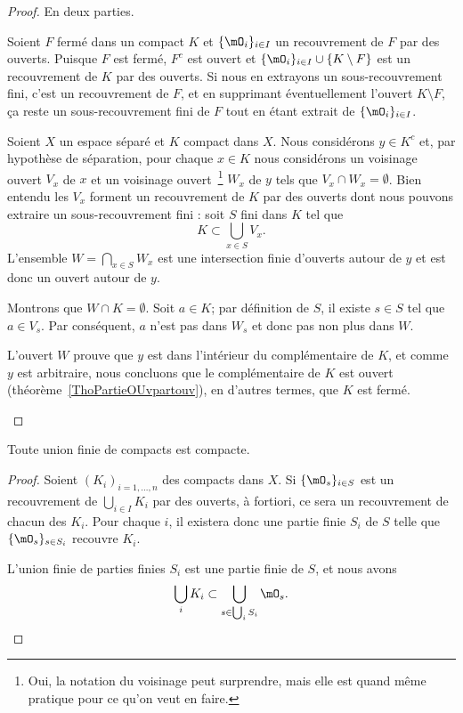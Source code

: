 \begin{proof}
	En deux parties.
	\begin{subproof}
		Soient \( F\) fermé dans un compact \( K\) et \( \{ \mO_i \}_{i\in I}\) un recouvrement de \( F\) par des ouverts. Puisque \( F\) est fermé, \( F^c\) est ouvert et \( \{ \mO_i \}_{i\in I}\cup\{ K\setminus F \}\) est un recouvrement de \( K\) par des ouverts. Si nous en extrayons un sous-recouvrement fini, c'est un recouvrement de \( F\), et en supprimant éventuellement l'ouvert \( K\setminus F\), ça reste un sous-recouvrement fini de \( F\) tout en étant extrait de \( \{ \mO_i \}_{i\in I}\).

		Soient \( X\) un espace séparé et \( K\) compact dans \( X\). Nous considérons \( y \in K^c\) et, par hypothèse de séparation, pour chaque \( x\in K\) nous considérons un voisinage ouvert \( V_x\) de \( x\) et un voisinage ouvert~\footnote{Oui, la notation du voisinage peut surprendre, mais elle est quand même pratique pour ce qu'on veut en faire.} \( W_x\) de \( y\) tels que \( V_x\cap W_x=\emptyset\). Bien entendu les \( V_x\) forment un recouvrement de \( K\) par des ouverts dont nous pouvons extraire un sous-recouvrement fini : soit \( S\) fini dans \( K\) tel que
		\begin{equation}
			K\subset\bigcup_{x\in S}V_x.
		\end{equation}
		L'ensemble \( W=\bigcap_{x\in S}W_x\) est une intersection finie d'ouverts autour de \( y\) et est donc un ouvert autour de \( y\).

		Montrons que \( W\cap K=\emptyset\). Soit \( a\in K\); par définition de \( S\), il existe \( s\in S\) tel que \( a\in V_s\). Par conséquent, \( a\) n'est pas dans \( W_s\) et donc pas non plus dans \( W\).

		L'ouvert \( W\) prouve que \( y\) est dans l'intérieur du complémentaire de \( K\), et comme \( y \) est arbitraire, nous concluons que le complémentaire de \( K\) est ouvert (théorème~\ref{ThoPartieOUvpartouv}), en d'autres termes, que \( K\) est fermé.
	\end{subproof}
\end{proof}


\begin{lemma}        \label{LEMooFJZDooSxYWVW}
	Toute union finie de compacts est compacte.
\end{lemma}

\begin{proof}
	Soient \( (K_i)_{i=1,\ldots, n}\) des compacts dans \( X\). Si \( \{ \mO_s \}_{i\in S}\) est un recouvrement de \( \bigcup_{i\in I}K_i\) par des ouverts, à fortiori, ce sera un recouvrement de chacun des \( K_i\). Pour chaque \( i\), il existera donc une partie finie \( S_i\) de \( S\) telle que \( \{ \mO_s \}_{s\in S_i}\) recouvre \( K_i\).

	L'union finie de parties finies \( S_i \) est une partie finie de \( S\), et nous avons
	\begin{equation}
		\bigcup_iK_i\subset \bigcup_{s\in \bigcup_iS_i}\mO_s.
	\end{equation}
\end{proof}

